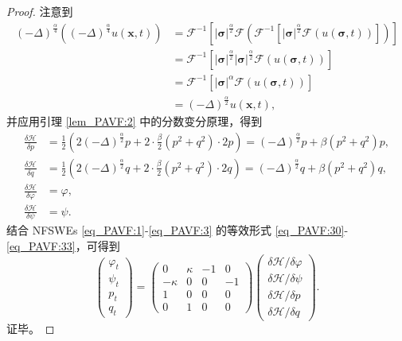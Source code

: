 \begin{proof}
注意到
\begin{align}\label{eq_PAVF:12071}
(-\Delta)^{\frac{\alpha}{4}}((-\Delta)^{\frac{\alpha}{4}}  u(\boldsymbol{x},t))&=\mathcal{F}^{-1}\left[|\boldsymbol{\sigma}|^{\frac{\alpha}{2}} \mathcal{F}(\mathcal{F}^{-1}\left[|\boldsymbol{\sigma}|^{\frac{\alpha}{2}} \mathcal{F}(u(\boldsymbol{\sigma},t))\right])\right]\nonumber\\
&=\mathcal{F}^{-1}\left[|\boldsymbol{\sigma}|^{\frac{\alpha}{2}} |\boldsymbol{\sigma}|^{\frac{\alpha}{2}} \mathcal{F}(u(\boldsymbol{\sigma},t))\right]\nonumber\\
&=\mathcal{F}^{-1}\left[|\boldsymbol{\sigma}|^{\alpha} \mathcal{F}(u(\boldsymbol{\sigma},t))\right]\nonumber\\
&=(-\Delta)^{\frac{\alpha}{2}} u(\boldsymbol{x},t),
\end{align}
并应用引理 \ref{lem_PAVF:2} 中的分数变分原理，得到
\begin{align}
\frac{\delta \mathcal{H}}{\delta p} &=\frac{1}{2}\left(2(-\Delta)^{\frac{\alpha}{2}} p+2 \cdot \frac{\beta}{2}\left(p^{2}+q^{2}\right) \cdot 2 p\right)=(-\Delta)^{\frac{\alpha}{2}}p+\beta\left(p^{2}+q^{2}\right) p,\label{eq_PAVF:38a}\\
\frac{\delta \mathcal{H}}{\delta q} &=\frac{1}{2}\left(2(-\Delta)^{\frac{\alpha}{2}} q+2 \cdot \frac{\beta}{2}\left(p^{2}+q^{2}\right) \cdot 2 q\right)=(-\Delta)^{\frac{\alpha}{2}}q+\beta\left(p^{2}+q^{2}\right) q,\label{eq_PAVF:38b}\\
\frac{\delta \mathcal{H}}{\delta \varphi} &=\varphi,\label{eq_PAVF:38c}\\
\frac{\delta \mathcal{H}}{\delta \psi} &=\psi.\label{eq_PAVF:38}
\end{align}
结合 NFSWEs \eqref{eq_PAVF:1}-\eqref{eq_PAVF:3} 的等效形式 \eqref{eq_PAVF:30}-\eqref{eq_PAVF:33}，可得到
\begin{equation}\label{eq_PAVF:39}
\left(\begin{array}{l}
		\varphi_{t} \\
		\psi_{t} \\
		p_{t} \\
		q_{t}
\end{array}\right)
=\left(\begin{array}{cccc}
			0 & \kappa & -1 & 0 \\
			-\kappa & 0 & 0 & -1 \\
			1 & 0 & 0 & 0 \\
			0 & 1 & 0 & 0
\end{array}\right)
\left(\begin{array}{l}
		\delta \mathcal{H} / \delta \varphi \\
		\delta \mathcal{H} / \delta \psi \\
		\delta \mathcal{H} / \delta p \\
		\delta \mathcal{H} / \delta q
\end{array}\right).
\end{equation}
证毕。
\end{proof}

